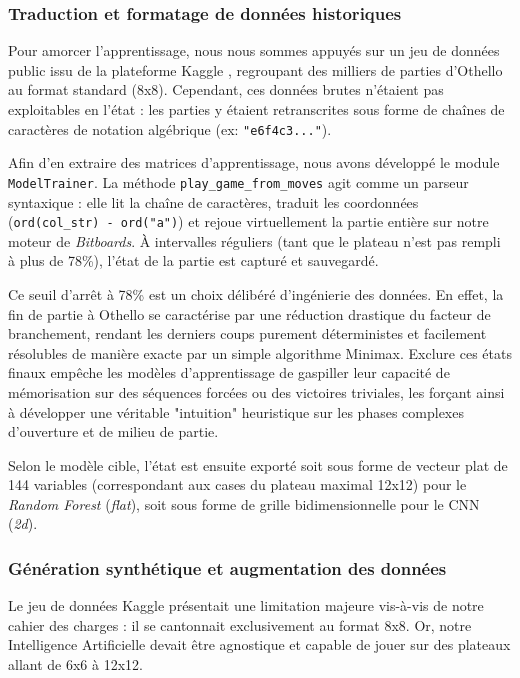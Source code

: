\documentclass[a4paper]{article}
\begin{document}
\subsubsection{Traduction et formatage de données historiques}
Pour amorcer l'apprentissage, nous nous sommes appuyés sur un jeu de données public issu de la plateforme Kaggle \cite{KaggleOthello}, regroupant des milliers de parties d'Othello au format standard (8x8). Cependant, ces données brutes n'étaient pas exploitables en l'état : les parties y étaient retranscrites sous forme de chaînes de caractères de notation algébrique (ex: \verb|"e6f4c3..."|).

Afin d'en extraire des matrices d'apprentissage, nous avons développé le module \texttt{ModelTrainer}. La méthode \texttt{play\_game\_from\_moves} agit comme un parseur syntaxique : elle lit la chaîne de caractères, traduit les coordonnées (\verb|ord(col_str) - ord("a")|) et rejoue virtuellement la partie entière sur notre moteur de \textit{Bitboards}. À intervalles réguliers (tant que le plateau n'est pas rempli à plus de 78\%), l'état de la partie est capturé et sauvegardé.

Ce seuil d'arrêt à 78\% est un choix délibéré d'ingénierie des données. En effet, la fin de partie à Othello se caractérise par une réduction drastique du facteur de branchement, rendant les derniers coups purement déterministes et facilement résolubles de manière exacte par un simple algorithme Minimax. Exclure ces états finaux empêche les modèles d'apprentissage de gaspiller leur capacité de mémorisation sur des séquences forcées ou des victoires triviales, les forçant ainsi à développer une véritable "intuition" heuristique sur les phases complexes d'ouverture et de milieu de partie.

Selon le modèle cible, l'état est ensuite exporté soit sous forme de vecteur plat de 144 variables (correspondant aux cases du plateau maximal 12x12) pour le \textit{Random Forest} (\textit{flat}), soit sous forme de grille bidimensionnelle pour le CNN (\textit{2d}).

\subsubsection{Génération synthétique et augmentation des données}
Le jeu de données Kaggle présentait une limitation majeure vis-à-vis de notre cahier des charges : il se cantonnait exclusivement au format 8x8. Or, notre Intelligence Artificielle devait être agnostique et capable de jouer sur des plateaux allant de 6x6 à 12x12.
\end{document}
